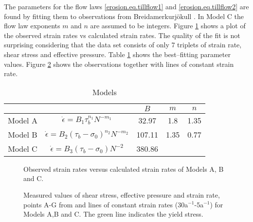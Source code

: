 The parameters for the flow laws \eqref{erosion.eq.tillflow1} and \eqref{erosion.eq.tillflow2} are found by fitting them to observations from Breidamerkurj\"okull \citep{Boulton1987}. In Model C the flow law exponents $m$ and $n$ are assumed to be integers. Figure \ref{erosion.fig.stress-strain-fit} shows a plot of the observed strain rates vs calculated strain rates. The quality of the fit is not surprising considering that the data set consists of only 7 triplets of strain rate, shear stress and effective pressure. Table \ref{erosion.tab.models} shows the best--fitting parameter values. Figure \ref{erosion.fig.stress-strain} shows the observations together with lines of constant strain rate.

\begin{table}[htbp]
  \centering
  \begin{tabular}{|c|c|ccc|}
    \hline
    \multicolumn{2}{c|}{} & $B$ & $m$ & $n$ \\
    \hline
    Model A& $\dot\epsilon=B_1{\tau_b^{n_1}}{N^{-m_1}}$            & 32.97  & 1.8 & 1.35 \\
    Model B& $\dot\epsilon=B_2{(\tau_b-\sigma_0)^{n_2}}{N^{-m_2}}$ & 107.11 & 1.35 & 0.77 \\
    Model C& $\dot\epsilon=B_3{(\tau_b-\sigma_0)}{N^{-2}}$         & 380.86 & \multicolumn{2}{c|}{}\\
    \hline
  \end{tabular}
  \caption{Models}
  \label{erosion.tab.models}
\end{table}


\begin{figure}[htbp]
  \centering
  
  \caption{Observed strain rates versus calculated strain rates of Models A, B and C.}
  \label{erosion.fig.stress-strain-fit}
\end{figure}

\begin{figure}[htbp]
  \centering
  
  \caption{Measured values of shear stress, effective pressure and strain rate, points A-G from \citet{Boulton1987} and lines of constant strain rates (30a$^{-1}$-5a$^{-1}$) for Models A,B and C. The green line indicates the yield stress.}
  \label{erosion.fig.stress-strain}
\end{figure}

